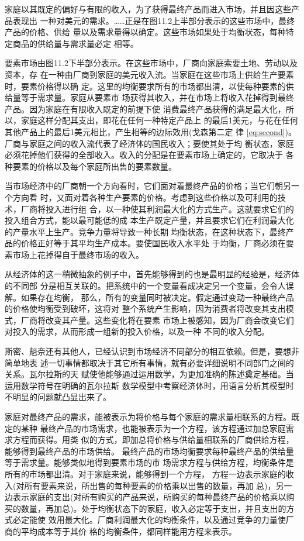 家庭以其既定的偏好与有限的收入，为了获得最终产品而进入市场，并且因这些产品表现出
一种对美元的需求。……正是在图11.2上半部分表示的这些市场中，最终产品的价格、供给
量以及需求量得以确定。这些市场如果处于均衡状态，每种特定商品的供给量与需求量必定
相等。

要素市场由图11.2下半部分表示。在这些市场中，厂商向家庭索要土地、劳动以及资本，存
在一种由厂商到家庭的美元收入流。当家庭在这些市场上供给生产要素时，要素价格得以确
定。这里的均衡要求所有的市场都出清，以使每种要素的供给量等于需求量。家庭从要素市
场获得其收入，并在市场上将收入花掉得到最终产品。因为家庭在有限收入既定的前提下使
消费最终产品获得的满足最大化，所以，家庭这样分配其支出，即花在任何一种特定产品上
的最后1美元，与花在任何其他产品上的最后1美元相比，产生相等的边际效用(戈森第二定
律 \cref{eq:second})。厂商与家庭之间的收入流代表了经济体的国民收入；要使其处于均
衡状态，家庭必须花掉他们获得的全部收入。收入的分配是在要素市场上确定的，它取决于
各种要素的价格以及每个家庭所出售的要素数量。

当市场经济中的厂商朝一个方向看时，它们面对着最终产品的价格；当它们朝另一个方向看
时，又面对着各种生产要素的价格。考虑到这些价格以及可利用的技术，厂商将投入进行组
合，以一种使其利润最大化的方式生产。这就要求它们的投入组合方式，能以最可能低的成
本生产既定产量，并且要求它们在利润最大化的产量水平上生产。竞争力量将导致一种长期
均衡状态，在这种状态下，最终产品的价格正好等于其平均生产成本。要使国民收入水平处
于均衡，厂商必须在要素市场上花掉得自于最终市场的收入。

从经济体的这一稍微抽象的例子中，首先能够得到的也是最明显的经验是，经济体的不同部
分是相互关联的。把系统中的一个变量看成决定另一个变量，会令人误解。如果存在均衡，
那么，所有的变量同时被决定。假定通过变动一种最终产品的价格使均衡受到破坏，这将对
整个系统产生影响，因为消费者将改变其支出模式，厂商将改变其产量。这些变化将在要素
市场上被感知，因为厂商会改变它们对投入的需求，从而形成一组新的投入价格，以及一种
不同的收入分配。

斯密、魁奈还有其他人，已经认识到市场经济不同部分的相互依赖。但是，要想非简单地表
述一切事情都取决于其它所有事情，就有必要详细说明不同部门之间的关系。瓦尔拉斯的天
赋使他能够通过运用数学，为更加准确的陈述奠定基础。当运用数学符号在明确的瓦尔拉斯
数学模型中考察经济体时，用语言分析其模型时不明显的问题就凸显出来了。

家庭对最终产品的需求，能被表示为将价格与每个家庭的需求量相联系的方程。既定的某种
最终产品的市场需求，也能被表示为一个方程，该方程通过加总家庭需求方程而获得。用类
似的方式，即加总将价格与供给量相联系的厂商供给方程，能够得到最终产品的市场供给。
最终产品的市场均衡要求每种最终产品的供给量等于需求量。能够类似地得到要素市场的市
场需求方程与供给方程，均衡条件是所有的市场都出清。对于家庭来说，能够得到一个方程，
方程一边表示家庭的收入(对所有要素来说，所出售的每种要素的价格乘以出售的数量，再加
总)，另一边表示家庭的支出(对所有购买的产品来说，所购买的每种最终产品的价格乘以购
买的数量，再加总)。处于均衡状态下的家庭，收入必定等于支出，并且支出的方式必定能使
效用最大化。厂商利润最大化的均衡条件，以及通过竞争的力量使厂商的平均成本等于其价
格的均衡条件，都同样能用方程来表示。

